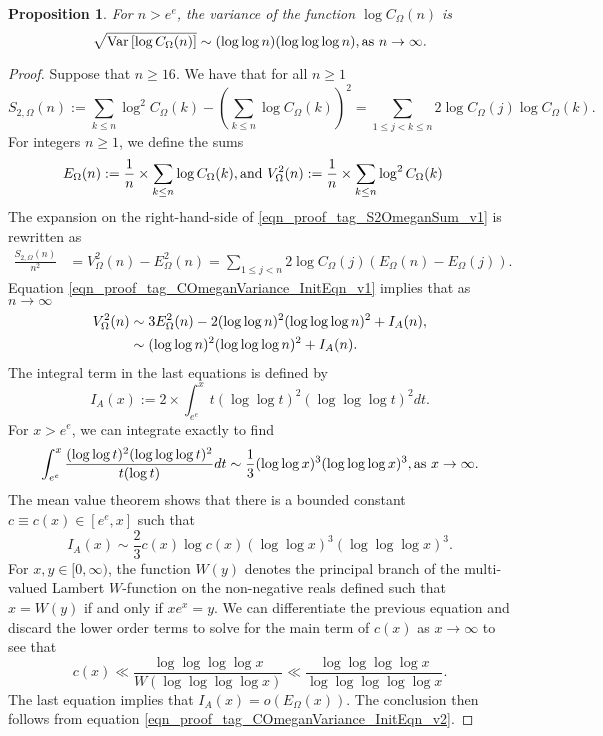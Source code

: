 \documentclass[11pt,reqno,a4letter]{article}
\numberwithin{equation}{section}
\numberwithin{figure}{section}
\numberwithin{table}{section}
\theoremstyle{plain}
\newtheorem{prop}[theorem]{Proposition}
\numberwithin{theorem}{section}
\theoremstyle{definition}
\theoremstyle{remark}
\newcommand{\mathtext}[1]{\text{\rm #1}}
\begin{document}
\begin{prop}
\label{prop_VarianceStat_for_COmegan_v1}
\label{prop_COmeganFunc_Variance_v1}
For $n > e^e$, the variance of the function $\log C_{\Omega}(n)$ is
\[
\sqrt{\operatorname{Var}\left[\log C_{\Omega}(n)\right]} \sim 
	(\log\log n) (\log\log\log n), 
	\mathtext{ as } n \rightarrow \infty. 
\]
\end{prop}
\begin{proof}
Suppose that $n \geq 16$. We have that for all $n \geq 1$  
\begin{equation}
\label{eqn_proof_tag_S2OmeganSum_v1}
S_{2,\Omega}(n) := \sum_{k \leq n} \log^2 C_{\Omega}(k) - 
     \left(\sum_{k \leq n} \log C_{\Omega}(k)\right)^2 = 
     \sum_{1 \leq j < k \leq n} 2 \log C_{\Omega}(j) \log C_{\Omega}(k).
\end{equation}
For integers $n \geq 1$, we define the sums 
\begin{align*}
E_{\Omega}(n) & := \frac{1}{n} \times \sum_{k \leq n} \log C_{\Omega}(k), 
     \mathtext{ and } 
V_{\Omega}^2(n) := \frac{1}{n} \times \sum_{k \leq n} \log^2 C_{\Omega}(k) 
\end{align*}
The expansion on the right-hand-side of \eqref{eqn_proof_tag_S2OmeganSum_v1} is rewritten as 
\begin{align}
\label{eqn_proof_tag_COmeganVariance_InitEqn_v1}
\frac{S_{2,\Omega}(n)}{n^2} & = V_{\Omega}^2(n) - E_{\Omega}^2(n) = 
     \sum_{1 \leq j < n} 2 \log C_{\Omega}(j) \left(
     E_{\Omega}(n) - E_{\Omega}(j)\right). 
\end{align} 
Equation \eqref{eqn_proof_tag_COmeganVariance_InitEqn_v1} implies that as $n \rightarrow \infty$ 
\begin{align}
\notag
V_{\Omega}^2(n) & \sim 3E_{\Omega}^2(n) - 
	2 (\log\log n)^2 (\log\log\log n)^2 + I_A(n), \\ 
\label{eqn_proof_tag_COmeganVariance_InitEqn_v2}
	& \sim (\log\log n)^2 (\log\log\log n)^2 + I_A(n). 
\end{align} 
The integral term in the last equations is defined by 
\[
I_A(x) := 2 \times \int_{e^e}^x t (\log\log t)^2 (\log\log\log t)^2 dt. 
\]
For $x > e^e$, we can integrate exactly to find 
\[
\int_{e^e}^x \frac{(\log\log t)^2 (\log\log\log t)^2}{t(\log t)} dt \sim 
	\frac{1}{3} (\log\log x)^3 (\log\log\log x)^3, 
	\mathtext{ as } x \rightarrow \infty. 
\]
The mean value theorem shows that there is a bounded constant 
$c \equiv c(x) \in [e^e, x]$ such that 
\[
I_A(x) \sim \frac{2}{3} c(x) \log c(x) (\log\log x)^3 (\log\log\log x)^3. 
\]
For $x,y \in [0, \infty)$, the function $W(y)$ 
denotes the principal branch of the multi-valued 
Lambert $W$-function on the non-negative reals defined such that 
$x = W(y)$ if and only if $xe^{x} = y$. 
We can differentiate the previous equation and discard the lower order terms to solve 
for the main term of $c(x)$ as $x \rightarrow \infty$ to see that 
\[
c(x) \ll \frac{\log\log\log\log x}{W\left(\log\log\log\log x\right)} \ll 
	\frac{\log\log\log\log x}{\log\log\log\log\log x}.
\]
The last equation implies that $I_A(x) = o\left(E_{\Omega}(x)\right)$. 
The conclusion then follows from equation \eqref{eqn_proof_tag_COmeganVariance_InitEqn_v2}. 
\end{proof}
\end{document}
